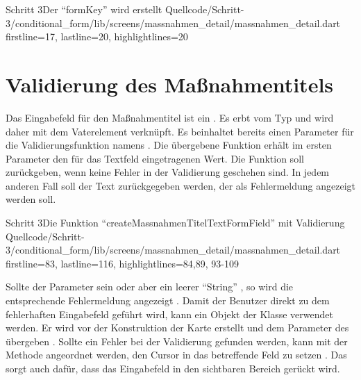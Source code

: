 \begin{alexlisting}{Schritt 3}{Der \enquote{formKey} wird erstellt}
    {Quellcode/Schritt-3/conditional_form/lib/screens/massnahmen_detail/massnahmen_detail.dart}
    {firstline=17, lastline=20, highlightlines={20}}
    \label{lst:Schritt3FormState}
\end{alexlisting}

\section{Validierung des Maßnahmentitels}

Das Eingabefeld für den Maßnahmentitel ist ein  .
Es erbt vom Typ  und wird daher mit dem Vaterelement  verknüpft.
Es beinhaltet bereits einen Parameter für die Validierungsfunktion namens  .
Die übergebene Funktion erhält im ersten Parameter den für das Textfeld eingetragenen Wert.
Die Funktion soll  zurückgeben, wenn keine Fehler in der Validierung geschehen sind.
In jedem anderen Fall soll der Text zurückgegeben werden, der als Fehlermeldung angezeigt werden soll.

\begin{alexlisting}{Schritt 3}{Die Funktion \enquote{createMassnahmenTitelTextFormField} mit Validierung}
    {Quellcode/Schritt-3/conditional_form/lib/screens/massnahmen_detail/massnahmen_detail.dart}
    {firstline=83, lastline=116, highlightlines={84,89, 93-109}}
    \label{lst:Schritt3createMassnahmenTitelTextFormFieldValidator}
\end{alexlisting}

Sollte der Parameter  sein oder aber ein leerer \enquote{String} , so wird die entsprechende Fehlermeldung  angezeigt .
Damit der Benutzer direkt zu dem fehlerhaften Eingabefeld geführt wird, kann ein Objekt der Klasse  verwendet werden.
Er wird vor der Konstruktion der Karte erstellt  und dem Parameter  des  übergeben .
Sollte ein Fehler bei der Validierung gefunden werden, kann mit der Methode  angeordnet werden, den Cursor in das betreffende Feld zu setzen .
Das sorgt auch dafür, dass das Eingabefeld in den sichtbaren Bereich gerückt wird.

